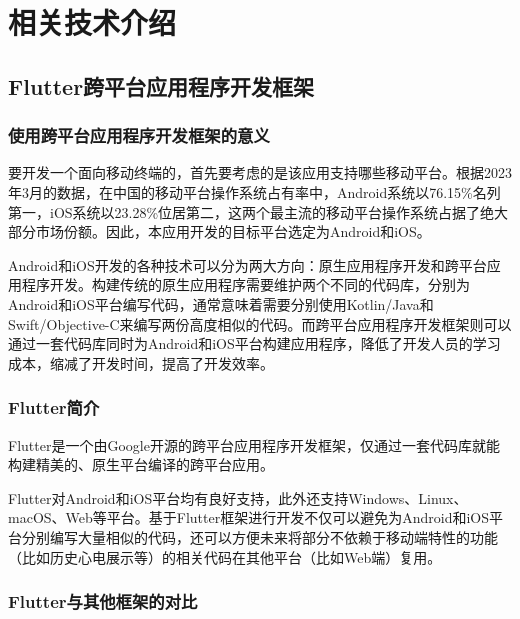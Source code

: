 

\chapter{相关技术介绍}\label{ch:tech}


\section{Flutter跨平台应用程序开发框架}\label{sec:flutter}

\subsection{使用跨平台应用程序开发框架的意义}\label{subsec:why-framework}

要开发一个面向移动终端的\app ，首先要考虑的是该应用支持哪些移动平台。根据2023年3月的数据\cite{MobileOperatingSystem}，在中国的移动平台操作系统占有率中，Android系统以76.15\%名列第一，iOS系统以23.28\%位居第二，这两个最主流的移动平台操作系统占据了绝大部分市场份额。因此，本应用开发的目标平台选定为Android和iOS。

Android和iOS开发的各种技术可以分为两大方向：原生应用程序开发和跨平台应用程序开发。构建传统的原生应用程序需要维护两个不同的代码库，分别为Android和iOS平台编写代码，通常意味着需要分别使用Kotlin/Java和Swift/Objective-C来编写两份高度相似的代码。而跨平台应用程序开发框架则可以通过一套代码库同时为Android和iOS平台构建应用程序，降低了开发人员的学习成本，缩减了开发时间，提高了开发效率。

\subsection{Flutter简介}\label{subsec:flutter}

Flutter是一个由Google开源的跨平台应用程序开发框架，仅通过一套代码库就能构建精美的、原生平台编译的跨平台应用\cite{FlutterFlutter2023}。

Flutter对Android和iOS平台均有良好支持，此外还支持Windows、Linux、macOS、Web等平台\cite{SupportedDeploymentPlatforms}。基于Flutter框架进行开发不仅可以避免为Android和iOS平台分别编写大量相似的代码，还可以方便未来将部分不依赖于移动端特性的功能（比如历史心电展示等）的相关代码在其他平台（比如Web端）复用。

\subsection{Flutter与其他框架的对比}\label{subsec:flutter-compare}

